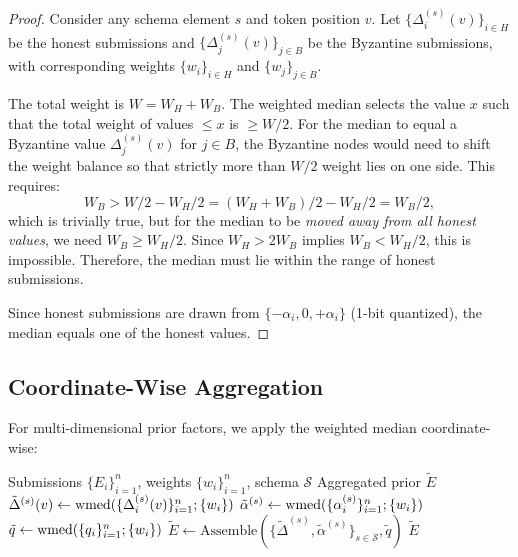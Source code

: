 \begin{proof}
Consider any schema element $s$ and token position $v$. Let
$\{\Delta_i^{(s)}(v)\}_{i \in H}$ be the honest submissions and
$\{\Delta_j^{(s)}(v)\}_{j \in B}$ be the Byzantine submissions, with
corresponding weights $\{w_i\}_{i \in H}$ and $\{w_j\}_{j \in B}$.

The total weight is $W = W_H + W_B$. The weighted median selects the value $x$
such that the total weight of values $\leq x$ is $\geq W/2$. For the median
to equal a Byzantine value $\Delta_j^{(s)}(v)$ for $j \in B$, the Byzantine
nodes would need to shift the weight balance so that strictly more than $W/2$
weight lies on one side. This requires:
\begin{equation}
    W_B > W/2 - W_H/2 = (W_H + W_B)/2 - W_H/2 = W_B/2,
\end{equation}
which is trivially true, but for the median to be \emph{moved away from all
honest values}, we need $W_B \geq W_H/2$. Since $W_H > 2W_B$ implies
$W_B < W_H/2$, this is impossible. Therefore, the median must lie within the
range of honest submissions.

Since honest submissions are drawn from $\{-\alpha_i, 0, +\alpha_i\}$ (1-bit
quantized), the median equals one of the honest values.
\end{proof}

\subsection{Coordinate-Wise Aggregation}

For multi-dimensional prior factors, we apply the weighted median coordinate-wise:

\begin{algorithm}[H]
\caption{Byzantine-Robust Prior Aggregation}
\label{alg:aggregation}
\begin{algorithmic}[1]
\Require Submissions $\{E_i\}_{i=1}^n$, weights $\{w_i\}_{i=1}^n$, schema $\mathcal{S}$
\Ensure Aggregated prior $\tilde{E}$
        \State $\tilde{\Delta}^{(s)}(v) \gets \operatorname{wmed}(\{\Delta_i^{(s)}(v)\}_{i=1}^n; \{w_i\})$
    \EndFor
    \State $\tilde{\alpha}^{(s)} \gets \operatorname{wmed}(\{\alpha_i^{(s)}\}_{i=1}^n; \{w_i\})$
\EndFor
\State $\tilde{q} \gets \operatorname{wmed}(\{q_i\}_{i=1}^n; \{w_i\})$
\State $\tilde{E} \gets \text{Assemble}(\{\tilde{\Delta}^{(s)}, \tilde{\alpha}^{(s)}\}_{s \in \mathcal{S}}, \tilde{q})$
\State \Return $\tilde{E}$
\end{algorithmic}
\end{algorithm}

